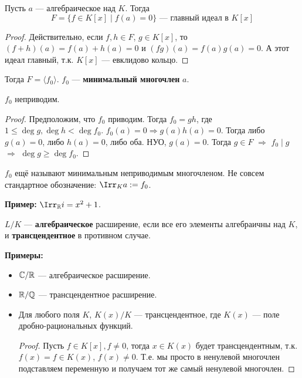 \begin{theorem}
    Пусть $a$ --- алгебраическое над $K$. Тогда
    $$ F = \{ f \in K[x] \mid f(a) = 0 \} \text{ --- главный идеал в $K[x]$} $$
\end{theorem}
\begin{proof}
    Действительно, если $f, h \in F$, $g \in K[x]$, то
    $(f + h)(a) = f(a) + h(a) = 0$ и $(fg)(a) = f(a) g(a) = 0$. А этот идеал главный, т.к. $K[x]$ --- евклидово кольцо.
\end{proof}
\begin{conj}
    Тогда $F = \langle f_0 \rangle$. $f_0$ --- \textbf{минимальный многочлен} 
    $a$.
\end{conj}

\begin{lemma}
    $f_0$ неприводим.
\end{lemma}
\begin{proof}
    Предположим, что $f_0$ приводим. Тогда $f_0 = gh$, где $1 \leqslant \deg g, \deg h < \deg f_0$. $f_0(a) = 0 \Rightarrow g(a) h(a) = 0$. Тогда либо $g(a) = 0$, либо $h(a) = 0$, либо оба. НУО, $g(a) = 0$. Тогда $g \in F$ $\Rightarrow$ $f_0 \mid g$ $\Rightarrow$ $\deg g \geqslant \deg f_0$.
\end{proof}

\notice $f_0$ ещё называют минимальным неприводимым многочленом. 
Не совсем стандартное обозначение: $\Irr_K a := f_0$. 

\textbf{Пример:} $\Irr_\R i = x^2 + 1$.

\begin{conj}
    $L / K$ --- \textbf{алгебраическое} расширение, если все его элементы алгебраичны над $K$, и \textbf{трансцендентное} в противном случае.
\end{conj}
\textbf{Примеры:}
\begin{itemize}
    \item $\mathbb{C} / \mathbb{R}$ --- алгебраическое расширение.
    \item $\mathbb{R} / \mathbb{Q}$ --- трансцендентное расширение.
    \item Для любого поля $K$, $K(x) / K$ --- трансцендентное, где $K(x)$ --- поле дробно-рациональных функций. 
    
    \begin{proof}
        Пусть $f \in K[x], f \neq 0$, тогда $x \in K(x)$ будет трансцендентным, т.к. $f(x) = f \in K(x)$, $f(x) \neq 0$. Т.е. мы просто в ненулевой многочлен подставляем переменную и получаем тот же самый ненулевой многочлен.
    \end{proof}
\end{itemize}